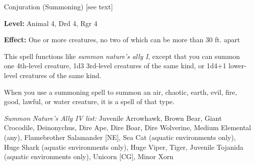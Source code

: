 
Conjuration (Summoning) [see text]

\textbf{Level:} Animal 4, Drd 4, Rgr 4

\textbf{Effect:} One or more creatures, no two of which can be more than 30 ft. 
apart

This spell functions like \textit{summon nature's ally I}, except that you can 
summon one 4th-level creature, 1d3 3rd-level creatures of the same kind, or 1d4+1 
lower-level creatures of the same kind.

When you use a summoning spell to summon an air, chaotic, earth, evil, fire, good, 
lawful, or water creature, it is a spell of that type.

\textit{Summon Nature's Ally IV list:} Juvenile Arrowhawk, Brown Bear, Giant Crocodile, Deinonychus, Dire Ape, Dire Boar, Dire Wolverine, Medium Elemental (any), Flamebrother Salamander [NE], Sea Cat (aquatic environments only), Huge Shark (aquatic environments only), Huge Viper, Tiger, Juvenile Tojanida (aquatic environments only), Unicorn [CG], Minor Xorn
